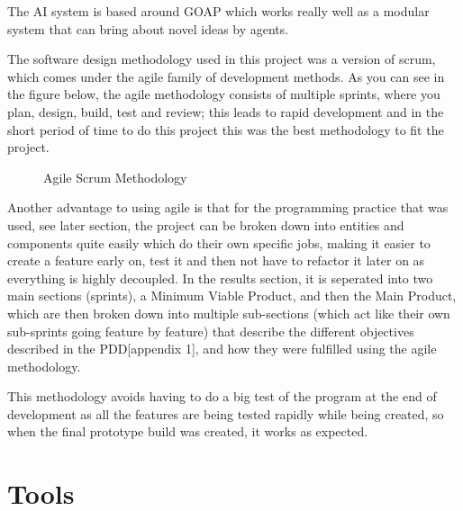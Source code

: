 \documentclass[12pt]{report}
\begin{document}
The AI system is based around GOAP which works really well as a modular system that can bring about novel ideas by agents.

The software design methodology used in this project was a version of scrum, which comes under the agile family of development methods. As you can see in the figure below\cite{AgileMethodology}, the agile methodology consists of multiple sprints, where you plan, design, build, test and review; this leads to rapid development and in the short period of time to do this project this was the best methodology to fit the project. 
\begin{figure}[H]
    \centering
    \caption{Agile Scrum Methodology}
\end{figure}
Another advantage to using agile is that for the programming practice that was used, see later section, the project can be broken down into entities and components quite easily which do their own specific jobs, making it easier to create a feature early on, test it and then not have to refactor it later on as everything is highly decoupled. In the results section, it is seperated into two main sections (sprints), a Minimum Viable Product, and then the Main Product, which are then broken down into multiple sub-sections (which act like their own sub-sprints going feature by feature) that describe the different objectives described in the PDD[appendix 1], and how they were fulfilled using the agile methodology. 

This methodology avoids having to do a big test of the program at the end of development as all the features are being tested rapidly while being created, so when the final prototype build was created, it works as expected.


\section{Tools}
\end{document}
